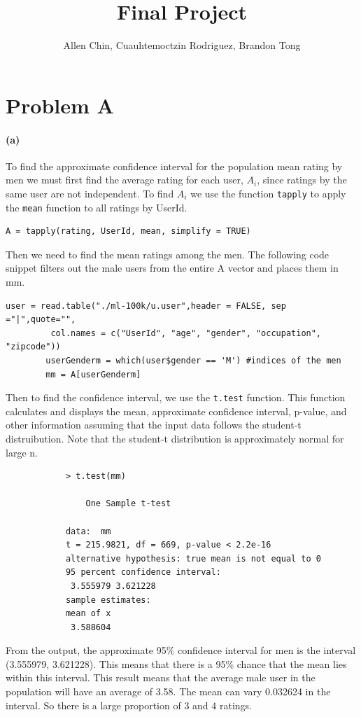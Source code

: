 \documentclass[fleqn]{article}
\begin{document}
\title{Final Project}
\author{Allen Chin, Cuauhtemoctzin Rodriguez, Brandon Tong}

\maketitle

\section*{Problem A}

	\paragraph{(a)}
		To find the approximate confidence interval for the population mean rating by men we must first find the average rating for each user, $A_i$, since ratings by the same user are not independent.
		To find $A_i$ we use the  function \texttt{tapply} to apply the \texttt{mean} function to all ratings by UserId.
		\begin{verbatim}A = tapply(rating, UserId, mean, simplify = TRUE)\end{verbatim}

		Then we need to find the mean ratings among the men. The following code snippet filters out the male users from the entire A vector and places them in mm.
		\begin{verbatim}user = read.table("./ml-100k/u.user",header = FALSE, sep ="|",quote="", 
		 col.names = c("UserId", "age", "gender", "occupation", "zipcode"))
		userGenderm = which(user$gender == 'M') #indices of the men
		mm = A[userGenderm]\end{verbatim}

		Then to find the confidence interval, we use the \texttt{t.test} function. This function calculates and displays the mean, approximate confidence interval, p-value, and other information assuming that the input data follows the student-t distruibution. Note that the student-t distribution is approximately normal for large n.
		\begin{verbatim}
			> t.test(mm)

				One Sample t-test

			data:  mm
			t = 215.9821, df = 669, p-value < 2.2e-16
			alternative hypothesis: true mean is not equal to 0
			95 percent confidence interval:
			 3.555979 3.621228
			sample estimates:
			mean of x 
			 3.588604 
		\end{verbatim}
		From the output, the approximate 95\% confidence interval for men is the interval (3.555979, 3.621228). This means that there is a 95\% chance that the mean lies within this interval. This result means that the average male user in the population will have an average of 3.58. The mean can vary 0.032624 in the interval. So there is a large proportion of 3 and 4 ratings.
\end{document}
